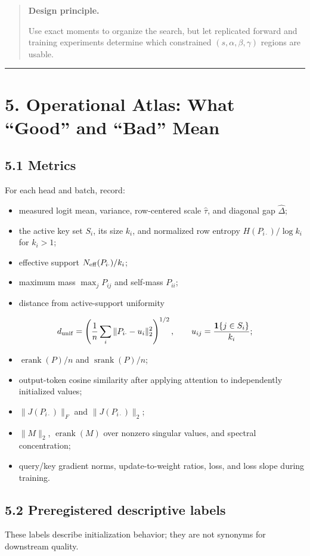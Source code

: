 \documentclass[11pt,letterpaper]{article}
\theoremstyle{definition}
\newenvironment{principle}{%
  \begin{quote}\small\color{ink}\textbf{Design principle.}\ %
}{%
  \end{quote}%
}
\begin{document}
\begin{principle}
Use exact moments to organize the search, but let replicated forward and training experiments determine which constrained $(s,\alpha,\beta,\gamma)$ regions are usable.
\end{principle}
\vspace{0.35em}\hrule\vspace{0.35em}
\section{5. Operational Atlas: What “Good” and “Bad” Mean}
\subsection{5.1 Metrics}
For each head and batch, record:

\begin{itemize}
  \item measured logit mean, variance, row-centered scale $\widehat\tau$, and diagonal gap $\widehat\Delta$;
  \item the active key set $S_i$, its size $k_i$, and normalized row entropy $H(P_{i\cdot})/\log k_i$ for $k_i>1$;
  \item effective support $N_{\rm eff}(P_{i\cdot})/k_i$;
  \item maximum mass $\max_jP_{ij}$ and self-mass $P_{ii}$;
  \item distance from active-support uniformity
\end{itemize}
\[
d_{\rm unif}
=\left(\frac1n\sum_i\|P_{i\cdot}-u_i\|_2^2\right)^{1/2},
\qquad
u_{ij}=\frac{\mathbf1\{j\in S_i\}}{k_i};
\]
\begin{itemize}
  \item $\operatorname{erank}(P)/n$ and $\operatorname{srank}(P)/n$;
  \item output-token cosine similarity after applying attention to independently initialized values;
  \item $\|J(P_{i\cdot})\|_F$ and $\|J(P_{i\cdot})\|_2$;
  \item $\|M\|_2$, $\operatorname{erank}(M)$ over nonzero singular values, and spectral concentration;
  \item query/key gradient norms, update-to-weight ratios, loss, and loss slope during training.
\end{itemize}
\subsection{5.2 Preregistered descriptive labels}
These labels describe initialization behavior; they are not synonyms for downstream quality.
\end{document}
